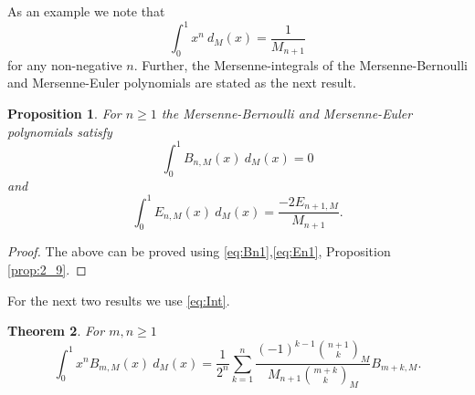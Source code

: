 \documentclass[12pt, a4paper]{article}
\newtheorem{theorem}{Theorem}[section]
\newtheorem{proposition}[theorem]{Proposition}
\begin{document}
As an example we note that 
\begin{equation*}
\int_{0}^{1} x^n~ d_M(x) = \frac{1}{M_{n+1}}
\end{equation*}
for any non-negative $n.$ Further, the Mersenne-integrals of the Mersenne-Bernoulli and Mersenne-Euler polynomials are stated as the next result.
\begin{proposition}
For $n \geq 1$ the Mersenne-Bernoulli and Mersenne-Euler polynomials satisfy
\begin{equation*}
\int_{0}^{1} B_{n,M}(x)~d_M(x) = 0
\end{equation*}
and
\begin{equation*}
\int_{0}^{1} E_{n,M}(x)~d_M(x) = \frac{-2E_{n+1,M}}{M_{n+1}}.
\end{equation*}
\end{proposition}
\begin{proof}
The above can be proved using \eqref{eq:Bn1},\eqref{eq:En1}, Proposition \ref{prop:2_9}.
\end{proof}
For the next two results we use \eqref{eq:Int}.
\begin{theorem}
For $m,n\geq 1$
\begin{equation*}
\int_{0}^{1}x^nB_{m,M}(x)~d_M(x) = \frac{1}{2^n}\sum_{k=1}^{n}\frac{(-1)^{k-1}\binom{n+1}{k}_M}{M_{n+1}\binom{m+k}{k}_M}B_{m+k,M}.
\end{equation*}
\end{theorem}
\end{document}
